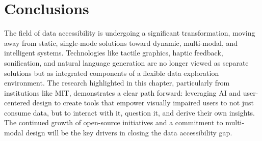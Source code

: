 \section{Conclusions}\label{ch13:sec:conclusions}
The field of data accessibility is undergoing a significant transformation, moving away from static, single-mode solutions toward dynamic, multi-modal, and intelligent systems. Technologies like tactile graphics, haptic feedback, sonification, and natural language generation are no longer viewed as separate solutions but as integrated components of a flexible data exploration environment. The research highlighted in this chapter, particularly from institutions like MIT, demonstrates a clear path forward: leveraging AI and user-centered design to create tools that empower visually impaired users to not just consume data, but to interact with it, question it, and derive their own insights. The continued growth of open-source initiatives and a commitment to multi-modal design will be the key drivers in closing the data accessibility gap.

